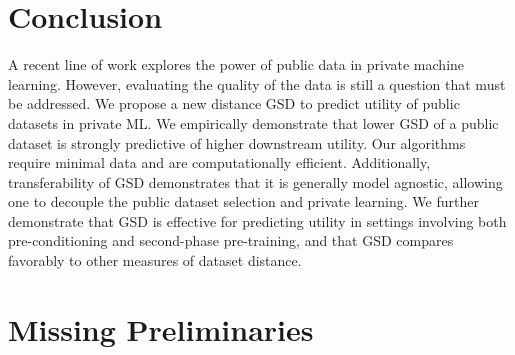 \documentclass[11pt]{article}
\begin{document}
\section{Conclusion}
A recent line of work explores the power of public data in private machine learning. However, evaluating the quality of the data is still a question that must be addressed. We propose a new distance GSD to predict utility of public datasets in private ML. 
We empirically demonstrate that lower GSD of a public dataset is strongly predictive of higher downstream utility. 
Our algorithms require minimal data and are computationally efficient.
Additionally, transferability of GSD demonstrates that it is generally model agnostic, allowing one to decouple the public dataset selection and private learning.
We further demonstrate that GSD is effective for predicting utility in settings involving both pre-conditioning and second-phase pre-training, and that GSD compares favorably to other measures of dataset distance. 





\newpage
\appendix
\onecolumn

\section{Missing Preliminaries}
\label{misspre}
\end{document}
